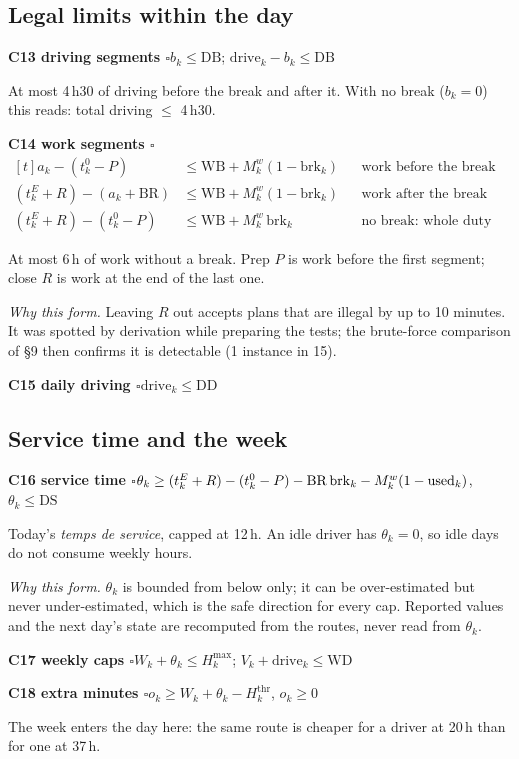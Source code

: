 \documentclass[11pt,a4paper]{article}
\newcommand{\ok}{$\square$}
\newcommand{\cons}[2]{\par\smallskip\noindent\textbf{\color{accent}#1}\quad #2\par}
\newcommand{\why}[1]{{\small\color{gray!70!black}\emph{Why this form.} #1}\par}
\newcommand{\DB}{\mathrm{DB}}\newcommand{\WB}{\mathrm{WB}}\newcommand{\BR}{\mathrm{BR}}
\newcommand{\DD}{\mathrm{DD}}\newcommand{\DS}{\mathrm{DS}}\newcommand{\WD}{\mathrm{WD}}
\newcommand{\drive}{\mathrm{drive}}\newcommand{\brk}{\mathrm{brk}}
\begin{document}
\subsection{Legal limits within the day}

\cons{C13 driving segments \ok}{$b_k \le \DB$; \qquad $\drive_k - b_k \le \DB$}
\begin{words}At most 4\,h30 of driving before the break and after it. With no break ($b_k=0$) this reads: total driving $\le$ 4\,h30.\end{words}

\cons{C14 work segments \ok}{
$\begin{aligned}[t]
a_k - (t^0_k - P) &\le \WB + M^{w}_k(1-\brk_k) && \text{work before the break}\\
(t^E_k + R) - (a_k + \BR) &\le \WB + M^{w}_k(1-\brk_k) && \text{work after the break}\\
(t^E_k + R) - (t^0_k - P) &\le \WB + M^{w}_k\,\brk_k && \text{no break: whole duty}
\end{aligned}$}
\begin{words}At most 6\,h of work without a break. Prep $P$ is work before the first segment; close $R$ is work at the end of the last one.\end{words}
\why{Leaving $R$ out accepts plans that are illegal by up to 10 minutes. It was spotted by derivation while preparing the tests; the brute-force comparison of §9 then confirms it is detectable (1 instance in 15).}

\cons{C15 daily driving \ok}{$\drive_k \le \DD$}

\subsection{Service time and the week}

\cons{C16 service time \ok}{$\theta_k \ge (t^E_k + R) - (t^0_k - P) - \BR\,\brk_k - M^{w}_k(1-\used_k)$, \qquad $\theta_k \le \DS$}
\begin{words}Today's \emph{temps de service}, capped at 12\,h. An idle driver has $\theta_k = 0$, so idle days do not consume weekly hours.\end{words}
\why{$\theta_k$ is bounded from below only; it can be over-estimated but never under-estimated, which is the safe direction for every cap. Reported values and the next day's state are recomputed from the routes, never read from $\theta_k$.}

\cons{C17 weekly caps \ok}{$W_k + \theta_k \le H^{\max}_k$; \qquad $V_k + \drive_k \le \WD$}
\cons{C18 extra minutes \ok}{$o_k \ge W_k + \theta_k - H^{\mathrm{thr}}_k$, \qquad $o_k \ge 0$}
\begin{words}The week enters the day here: the same route is cheaper for a driver at 20\,h than for one at 37\,h.\end{words}
\end{document}
